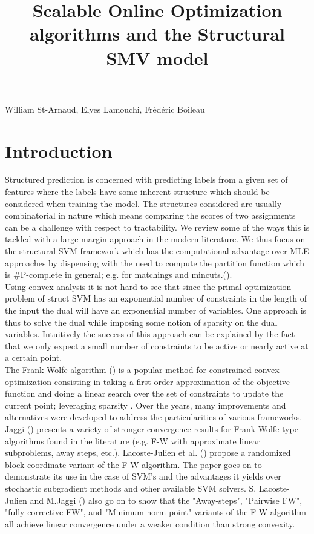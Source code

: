 \documentclass{article}
\title{Scalable Online Optimization algorithms and the Structural SMV model}
\date{}
\begin{document}
 

\maketitle


\vspace{-0.5in}
\begin{center}
William St-Arnaud, Elyes Lamouchi, Fr\'ed\'eric Boileau
\end{center}
\vspace{0.2in}


\section*{Introduction}

Structured prediction is concerned with predicting labels from a given
set of features where the labels have some inherent structure which should
be considered when training the model. The structures considered are usually
combinatorial in nature which means comparing the scores of two assignments
can be a challenge with respect to tractability. We review some of the ways
this is tackled with a large margin approach in the modern literature.
We thus focus on the structural SVM framework which has the computational
advantage over MLE approaches by dispensing with the need to compute the
partition function which is \#P-complete in general; e.g. for
matchings and mincuts.(\cite{dualextraSimon}).\\

Using convex analysis it is not hard to see that since the primal optimization
problem of struct SVM has an exponential number of constraints in the length of
the input the dual will have an exponential number of variables. One approach is
thus to solve the dual while imposing some notion of sparsity on the dual
variables. Intuitively the success of this approach can be explained by the fact
that we only expect a small number of constraints to be active or nearly active
at a certain point. \\

The Frank-Wolfe algorithm (\cite{f-w}) is a popular method for constrained
convex optimization consisting in taking a first-order approximation of the
objective function and doing a linear search over the set of constraints to
update the current point; leveraging sparsity . Over the years, many
improvements and alternatives were developed to address the particularities of
various frameworks. Jaggi (\cite{Jaggi:229246}) presents a variety of stronger
convergence results for Frank-Wolfe-type algorithms found in the literature
(e.g. F-W with approximate linear subproblems, away steps, etc.). Lacoste-Julien
et al. (\cite{dualextraSimon}) propose a randomized block-coordinate variant of
the F-W algorithm. The paper goes on to demonstrate its use in the case of SVM's
and the advantages it yields over stochastic subgradient methods and other
available SVM solvers. S. Lacoste-Julien and M.Jaggi
(\cite{2015arXiv151105932L}) also go on to show that the "Away-steps", "Pairwise
FW", "fully-corrective FW", and "Minimum norm point" variants of the F-W
algorithm all achieve linear convergence under a weaker condition than strong
convexity.\\
\end{document}
